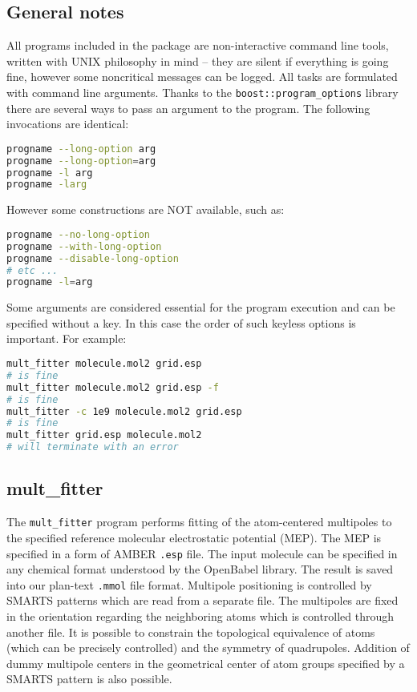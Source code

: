 \documentclass[10pt,a4paper]{article}
\begin{document}
\subsection{General notes}
All programs included in the package are non-interactive command line tools, written
with UNIX philosophy in mind -- they are silent if everything is going fine, however some
noncritical messages can be logged. All tasks are
formulated with command line arguments. Thanks to the \lstinline{boost::program_options} 
library there are several ways to pass an argument to the program. The following 
invocations are identical:
\begin{lstlisting}[language=bash]
progname --long-option arg
progname --long-option=arg
progname -l arg
progname -larg
\end{lstlisting}
However some constructions are NOT available, such as:
\begin{lstlisting}[language=bash]
progname --no-long-option
progname --with-long-option
progname --disable-long-option
# etc ...
progname -l=arg
\end{lstlisting}
Some arguments are considered essential for the program execution and can be specified
without a key. In this case the order of such keyless options is important. For
example:
\begin{lstlisting}[language=bash]
mult_fitter molecule.mol2 grid.esp      
# is fine
mult_fitter molecule.mol2 grid.esp -f  
# is fine
mult_fitter -c 1e9 molecule.mol2 grid.esp   
# is fine
mult_fitter grid.esp molecule.mol2      
# will terminate with an error
\end{lstlisting}

\subsection{mult\_fitter}
The \lstinline{mult_fitter} program performs fitting of the atom-centered multipoles to 
the specified
reference molecular electrostatic potential (MEP). The MEP is specified in a form of AMBER 
\lstinline{.esp} file. The input molecule can be specified in any chemical format
understood by the OpenBabel library. The result is saved
into our plan-text \lstinline{.mmol} file format. Multipole positioning is controlled by 
SMARTS patterns which are read from a separate file. The multipoles are fixed in the 
orientation regarding the neighboring atoms which is controlled through another file. 
It is possible to constrain the topological
equivalence of atoms (which can be precisely controlled) and the symmetry of quadrupoles. 
Addition of dummy multipole centers in the geometrical center of atom groups specified 
by a SMARTS pattern is also possible.
\end{document}
